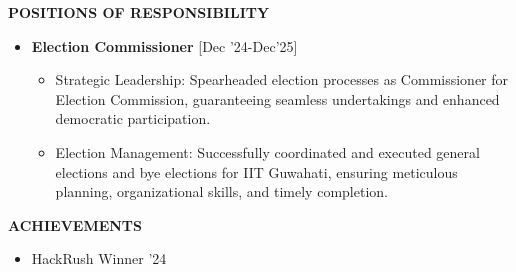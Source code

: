 \documentclass[a4paper,10pt]{article}
\newcommand{\isep}{-2 pt}
\newcommand{\resheading}[1]{{\small \colorbox{mygrey}{\begin{minipage}{0.965\textwidth}{\textbf{#1 \vphantom{p\^{E}}}}\end{minipage}}}}
\begin{document}
\resheading{\textbf{POSITIONS OF RESPONSIBILITY} }
\vspace{-0.4cm}
\begin{itemize} \itemsep \isep
\item \textbf{Election Commissioner}
\hfill [Dec '24-Dec'25] \\[-0.7cm]
\begin{itemize} \itemsep \isep
\item Strategic Leadership: Spearheaded election processes as Commissioner for Election Commission, guaranteeing seamless undertakings and enhanced democratic participation.
\item Election Management: Successfully coordinated and executed general elections and bye elections for IIT Guwahati, ensuring meticulous planning, organizational skills, and timely completion.
\end{itemize}

\end{itemize}

\resheading{\textbf{ACHIEVEMENTS} }
\begin{itemize}\itemsep\isep
\item {HackRush Winner '24}\vspace{0.1cm}

\end{itemize}
\end{document}
